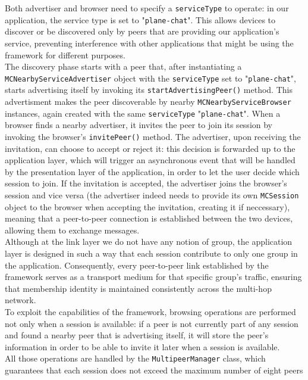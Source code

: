 \documentclass[conference]{IEEEtran}
\begin{document}
Both advertiser and browser need to specify a \texttt{serviceType} to operate:
in our application, the service type is set to "\texttt{plane-chat}". This
allows devices to discover or be discovered only by peers that are providing our
application's service, preventing interference with other applications that
might be using the framework for different purposes. \\ 

The discovery phase starts with a peer that, after instantiating a
\texttt{MCNearbyServiceAdvertiser} object with the \texttt{serviceType} set to
"\texttt{plane-chat}", starts advertising itself by invoking its
\texttt{startAdvertisingPeer()} method. This advertisment makes the peer
discoverable by nearby \texttt{MCNearbyServiceBrowser} instances, again created
with the same \texttt{serviceType} "\texttt{plane-chat}". When a browser finds a
nearby advertiser, it invites the peer to join its session by invoking the
browser's \texttt{invitePeer()} method. The advertiser, upon receiving the
invitation, can choose to accept or reject it: this decision is forwarded up to the
application layer, which will trigger an asynchronous event that will be handled
by the presentation layer of the application, in order to let the user decide
which session to join. If the invitation is accepted, the advertiser joins the
browser's session and vice versa (the advertiser indeed needs to provide its own
\texttt{MCSession} object to the browser when accepting the invitation, creating
it if neccessary), meaning that a peer-to-peer connection is established between
the two devices, allowing them to exchange messages. \\  
Although at the link layer we do not have any notion of group, the application
layer is designed in such a way that each session contribute to only one group
in the application. Consequently, every peer-to-peer link established by the
framework serves as a transport medium for that specific group's traffic,
ensuring that membership identity is maintained consistently across the
multi-hop network. \\
To exploit the capabilities of the framework, browsing operations are
performed not only when a session is available: if a peer is not currently part
of any session and found a nearby peer that is advertising itself, it will store 
the peer's information in order to be able to invite it later when a session is
available. \\
All those operations are handled by the \texttt{MultipeerManager} class, which
guarantees that each session does not exceed the maximum number of eight peers
\end{document}
